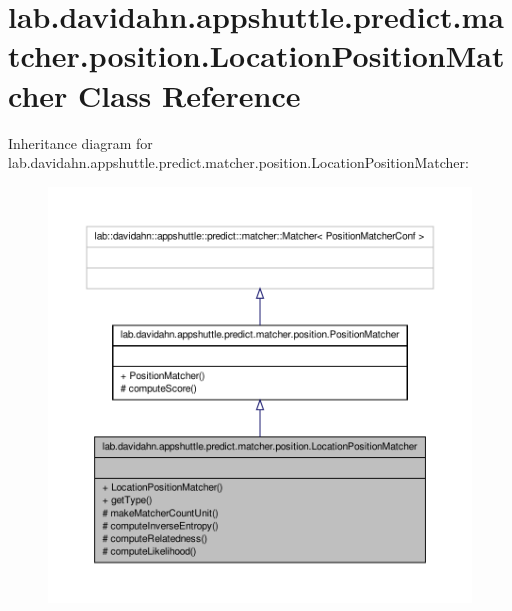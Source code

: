 \hypertarget{classlab_1_1davidahn_1_1appshuttle_1_1predict_1_1matcher_1_1position_1_1_location_position_matcher}{\section{lab.\-davidahn.\-appshuttle.\-predict.\-matcher.\-position.\-Location\-Position\-Matcher \-Class \-Reference}
\label{classlab_1_1davidahn_1_1appshuttle_1_1predict_1_1matcher_1_1position_1_1_location_position_matcher}
}


\-Inheritance diagram for lab.\-davidahn.\-appshuttle.\-predict.\-matcher.\-position.\-Location\-Position\-Matcher\-:
\nopagebreak
\begin{figure}[H]
\begin{center}
\leavevmode
\includegraphics[width=350pt]{classlab_1_1davidahn_1_1appshuttle_1_1predict_1_1matcher_1_1position_1_1_location_position_matcher__inherit__graph}
\end{center}
\end{figure}


